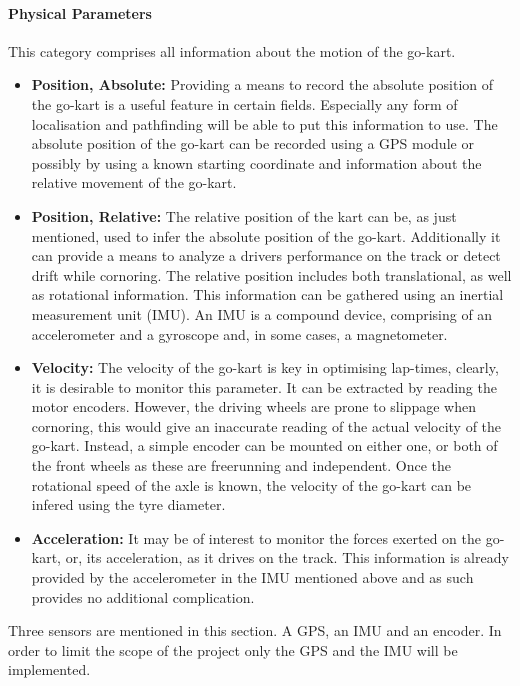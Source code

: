 \paragraph*{Physical Parameters}
This category comprises all information about the motion of the go-kart.
\begin{itemize}
	\item \textbf{Position, Absolute:} Providing a means to record the absolute position of the go-kart is a useful feature in certain fields.
	Especially any form of localisation and pathfinding will be able to put this information to use.
	The absolute position of the go-kart can be recorded using a GPS module or possibly by using a known starting coordinate and information about the relative movement of the go-kart.
	\item \textbf{Position, Relative:} The relative position of the kart can be, as just mentioned, used to infer the absolute position of the go-kart.
	Additionally it can provide a means to analyze a drivers performance on the track or detect drift while cornoring.
	The relative position includes both translational, as well as rotational information.
	This information can be gathered using an inertial measurement unit (IMU).
	An IMU is a compound device, comprising of an accelerometer and a gyroscope and, in some cases, a magnetometer.
	\item \textbf{Velocity:} The velocity of the go-kart is key in optimising lap-times, clearly, it is desirable to monitor this parameter.
	It can be extracted by reading the motor encoders.
	However, the driving wheels are prone to slippage when cornoring, this would give an inaccurate reading of the actual velocity of the go-kart.
	Instead, a simple encoder can be mounted on either one, or both of the front wheels as these are freerunning and independent.
	Once the rotational speed of the axle is known, the velocity of the go-kart can be infered using the tyre diameter.
	\item \textbf{Acceleration:} It may be of interest to monitor the forces exerted on the go-kart, or, its acceleration, as it drives on the track.
	This information is already provided by the accelerometer in the IMU mentioned above and as such provides no additional complication.
\end{itemize}
Three sensors are mentioned in this section.
A GPS, an IMU and an encoder.
In order to limit the scope of the project only the GPS and the IMU will be implemented.

